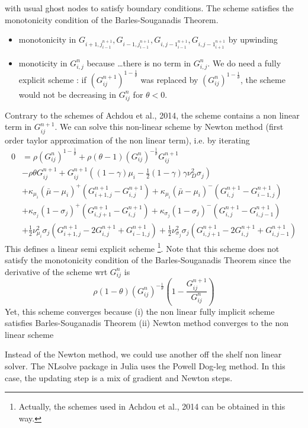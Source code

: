 \documentclass[english]{article}
\begin{document}
with usual ghost nodes to satisfy boundary conditions.
The scheme satisfies the monotonicity condition of the Barles-Souganadis Theorem. 
\begin{itemize}
	\item monotonicity in $G_{i+1, j}_{i-1}^{n+1}, G_{i-1, j}_{i-1}^{n+1}, G_{i, j-1}_{i-1}^{n+1}, G_{i, j-1}_{i+1}^{n+1}$ by upwinding 
	\item monoticity in $G_{i, j}^{n}$  because \dots there is  no term in $G_{i, j}^{n}$. We do need a fully explicit scheme : if $(G_{ij}^{n+1})^{1-\frac{1}{\theta}}$ was replaced  by $(G_{ij}^{n})^{1-\frac{1}{\theta}}$, the scheme would not be decreasing in $G_{ij}^{n}$ for $\theta < 0$.
\end{itemize}
Contrary to the schemes of Achdou et al., 2014,  the scheme contains a non linear term in $G_{ij}^{n+1}$. We can solve this non-linear scheme by Newton method (first order taylor approximation of the non linear term), i.e. by iterating
\begin{align*}
	0&= \rho (G_{ij}^{n})^{1-\frac{1}{\theta}}+ \rho  (\theta-1) (G_{ij}^{n})^{-\frac{1}{\theta}}G_{ij}^{n+1}\\
	&- \rho \theta G_{ij}^{{n+1}}+G_{ij}^{n+1}((1-\gamma)\mu_i-\frac{1}{2}(1-\gamma)\gamma\nu_D^2\sigma_j)\\
	&+\kappa_{\mu_i}(\bar{\mu}-\mu_i)^+(G_{i+1, j}^{n+1}-G_{i, j}^{n+1}) +\kappa_{\mu_i}(\bar{\mu}-\mu_i)^-(G_{i, j}^{n+1}-G_{i-1, j}^{n+1})\\
	&+\kappa_{\sigma_j}(1-\sigma_j)^+(G_{i, j+1}^{n+1}-G_{i,j}^{n+1}) +\kappa_{\sigma_j}(1-\sigma_j)^-(G_{i, j}^{n+1}-G_{i,j-1}^{n+1})\\
	&+\frac{1}{2}\nu_{\mu_i}^{2}\sigma_j(G_{i+1, j}^{n+1} - 2 G_{i, j}^{n+1} + G_{i-1, j}^{n+1})+\frac{1}{2}\nu_{\sigma_j}^{2}\sigma_j(G_{i, j+1}^{n+1} - 2 G_{i, j}^{n+1} + G_{i, j-1}^{n+1})
\end{align*}
This defines a linear semi explicit scheme \footnote{Actually, the schemes used in Achdou et al., 2014 can be obtained in this way.}. Note that this scheme does not satisfy the monotonicity condition of the Barles-Souganadis Theorem since the derivative of the scheme wrt $G_{ij}^{n}$ is 
$$\rho (1- \theta)(G_{ij}^{n})^{-\frac{1}{\theta}} (1- \frac{G_{ij}^{n+1}}{G_{ij}^{n}})$$
Yet, this scheme converges because (i) the non linear fully implicit scheme satisfies Barles-Souganadis Theorem (ii) Newton method converges to the non linear scheme


Instead of the Newton method, we could use another off the shelf non linear solver. The NLsolve package in Julia uses the Powell Dog-leg method. In this case, the updating step is a mix of gradient and Newton steps. 
\end{document}
